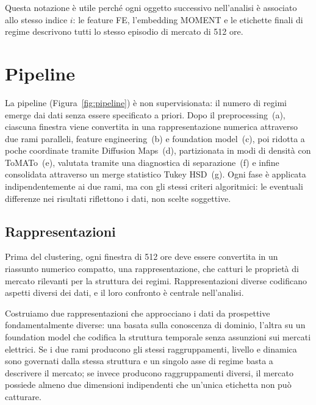 \documentclass[12pt]{article}
\begin{document}
\noindent Questa notazione è utile perché ogni oggetto successivo nell'analisi è associato allo stesso indice $i$: le feature FE, l'embedding MOMENT e le etichette finali di regime descrivono tutti lo stesso episodio di mercato di 512 ore.

\section{Pipeline}
\label{sec:pipeline}

La pipeline (Figura~\ref{fig:pipeline}) è non supervisionata: il numero di regimi emerge dai dati senza essere specificato a priori.
Dopo il preprocessing~(a), ciascuna finestra viene convertita in una rappresentazione numerica attraverso due rami paralleli, feature engineering~(b) e foundation model~(c), poi ridotta a poche coordinate tramite Diffusion Maps~(d), partizionata in modi di densità con ToMATo~(e), valutata tramite una diagnostica di separazione~(f) e infine consolidata attraverso un merge statistico Tukey HSD~(g).
Ogni fase è applicata indipendentemente ai due rami, ma con gli stessi criteri algoritmici: le eventuali differenze nei risultati riflettono i dati, non scelte soggettive.

\subsection{Rappresentazioni}
\label{sec:representations}

Prima del clustering, ogni finestra di 512 ore deve essere convertita in un riassunto numerico compatto, una rappresentazione, che catturi le proprietà di mercato rilevanti per la struttura dei regimi.
Rappresentazioni diverse codificano aspetti diversi dei dati, e il loro confronto è centrale nell'analisi.

Costruiamo due rappresentazioni che approcciano i dati da prospettive fondamentalmente diverse: una basata sulla conoscenza di dominio, l'altra su un foundation model che codifica la struttura temporale senza assunzioni sui mercati elettrici.
Se i due rami producono gli stessi raggruppamenti, livello e dinamica sono governati dalla stessa struttura e un singolo asse di regime basta a descrivere il mercato; se invece producono raggruppamenti diversi, il mercato possiede almeno due dimensioni indipendenti che un'unica etichetta non può catturare.
\end{document}
